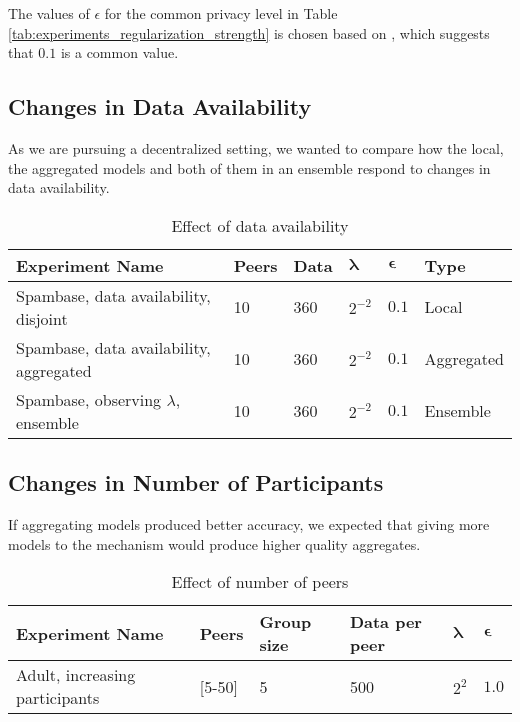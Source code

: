The values of $\epsilon$ for the  common privacy level in Table \ref{tab:experiments_regularization_strength} is chosen based on \cite{dwork2008differential}, which suggests that $0.1$ is a common value.

\subsection{Changes in Data Availability}

As we are pursuing a decentralized setting, we wanted to compare how the local, the aggregated models and both of them in an ensemble respond to changes in data availability.

\begin{table}[h]
	\centering
	\begin{tabular}{|l|l|l|l|l|l|}
		\textbf{Experiment Name}                                 & \textbf{Peers} & \textbf{Data} & $\boldsymbol{\lambda}$ & $\boldsymbol{\epsilon}$ & \textbf{Type}       \\
		\hline
		Spambase, data availability, disjoint         & 10    & 360  & $2^{-2}$  & $0.1$      & Local      \\
		Spambase, data availability, aggregated    & 10    & 360  & $2^{-2}$  & $0.1$      & Aggregated \\
		Spambase, observing $\lambda$, ensemble & 10    & 360  & $2^{-2}$  & $0.1$  & Ensemble  
	\end{tabular}
	\caption{Effect of data availability}
	\label{tab:experiments_data_availability}
\end{table}

\subsection{Changes in Number of Participants}

If aggregating models produced better accuracy, we expected that giving more models to the mechanism would produce higher quality aggregates.

\begin{table}[h]
	\centering
	\begin{tabular}{|l|l|l|l|l|l|}
		\textbf{Experiment Name}                & \textbf{Peers}      & \textbf{Group size} & \textbf{Data per peer} & $\boldsymbol{\lambda}$ & $\boldsymbol{\epsilon}$ \\
		\hline
		Adult, increasing participants & {[}5-50{]} & 5          & 500  & $2^{2}$   & $1.0$     
	\end{tabular}
	\caption{Effect of number of peers}
	\label{tab:experiments_peer_numbers}
\end{table}


